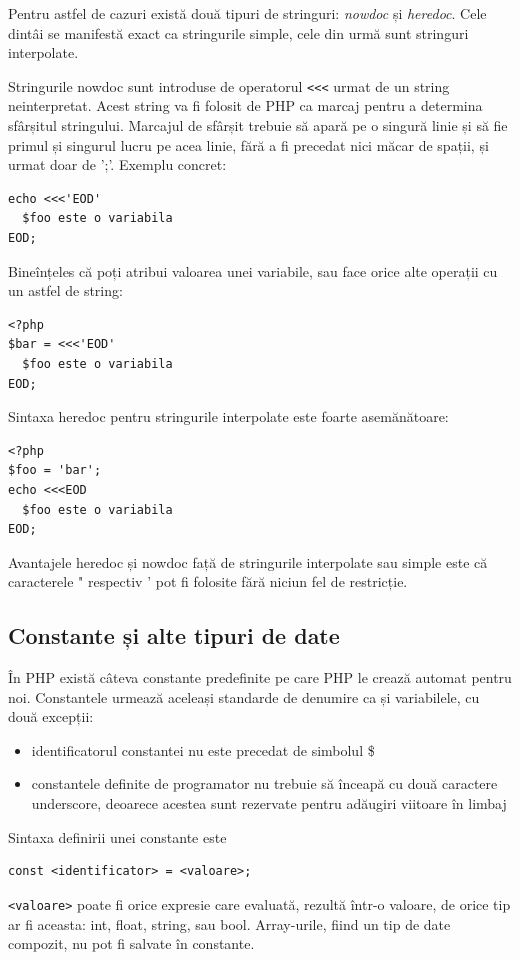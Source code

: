 Pentru astfel de cazuri există două tipuri de stringuri: \textsl{nowdoc} și \textsl{heredoc}.
Cele dintâi se manifestă exact ca stringurile simple, cele din urmă
sunt stringuri interpolate.

Stringurile nowdoc sunt introduse de operatorul  \verb '<<<' urmat de un string neinterpretat.
Acest string va fi folosit de PHP ca marcaj pentru a determina sfârșitul stringului. Marcajul de sfârșit trebuie
să apară pe o singură linie și să fie primul și singurul lucru pe acea linie, fără a fi precedat nici măcar
de spații, și urmat doar de ';'. Exemplu concret:

\begin{lstlisting}
echo <<<'EOD'
  $foo este o variabila 
EOD;
\end{lstlisting}

Bineînțeles că poți atribui valoarea unei variabile, sau face orice
alte operații cu un astfel de string:
\begin{lstlisting}
<?php
$bar = <<<'EOD'
  $foo este o variabila
EOD;
\end{lstlisting}

Sintaxa heredoc pentru stringurile interpolate este foarte asemănătoare:
\begin{lstlisting}
<?php
$foo = 'bar';
echo <<<EOD
  $foo este o variabila 
EOD;
\end{lstlisting}

Avantajele heredoc și nowdoc față de stringurile interpolate sau simple este că
caracterele " respectiv ' pot fi folosite fără niciun fel de restricție.

\subsection{Constante și alte tipuri de date}
În PHP există câteva constante predefinite pe care PHP le
crează automat pentru noi. Constantele urmează aceleași
standarde de denumire ca și variabilele, cu două excepții:
\begin{itemize}
	\item identificatorul constantei nu este precedat de simbolul \$
	\item constantele definite de programator nu trebuie să înceapă cu două caractere
underscore, deoarece acestea sunt rezervate pentru adăugiri viitoare în limbaj
\end{itemize}
Sintaxa definirii unei constante este
\begin{verbatim}
const <identificator> = <valoare>;
\end{verbatim}
\texttt{<valoare>} poate fi orice expresie care evaluată, rezultă într-o valoare,
de orice tip ar fi aceasta: int, float, string, sau bool. Array-urile, fiind un tip
de date compozit, nu pot fi salvate în constante.

